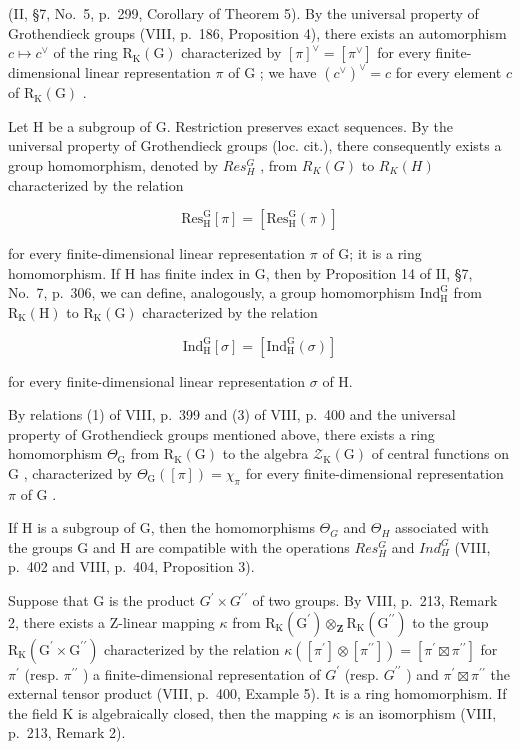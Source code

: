 (II, §7, No.~5, p.~299, Corollary of Theorem 5). By the universal property of Grothendieck groups (VIII, p.~186, Proposition 4), there exists an automorphism \(c \mapsto c^{\vee}\) of the ring \(\mathrm{R}_{\mathrm{K}}(\mathrm{G})\) characterized by \([\pi]^{\vee} = [\pi^{\vee}]\) for every finite-dimensional linear representation \(\pi\) of \(\mathrm{G}\) ; we have \((c^{\vee})^{\vee} = c\) for every element \(c\) of \(\mathrm{R}_{\mathrm{K}}(\mathrm{G})\) .

Let H be a subgroup of G. Restriction preserves exact sequences. By the universal property of Grothendieck groups (loc. cit.), there consequently exists a group homomorphism, denoted by \(Res_{H}^{G}\) , from \(R_{K}(G)\) to \(R_{K}(H)\) characterized by the relation

\[
\mathrm{Res} _ {\mathrm{H}} ^ {\mathrm{G}} [ \pi ] = [ \mathrm{Res} _ {\mathrm{H}} ^ {\mathrm{G}} (\pi) ]\tag{6}
\]

for every finite-dimensional linear representation \(\pi\) of G; it is a ring homomorphism. If H has finite index in G, then by Proposition 14 of II, §7, No.~7, p.~306, we can define, analogously, a group homomorphism \(\mathrm{Ind}_{\mathrm{H}}^{\mathrm{G}}\) from \(\mathrm{R}_{\mathrm{K}}(\mathrm{H})\) to \(\mathrm{R}_{\mathrm{K}}(\mathrm{G})\) characterized by the relation

\[
\mathrm{Ind} _ {\mathrm{H}} ^ {\mathrm{G}} [ \sigma ] = [ \mathrm{Ind} _ {\mathrm{H}} ^ {\mathrm{G}} (\sigma) ]\tag{7}
\]

for every finite-dimensional linear representation \(\sigma\) of H.

By relations (1) of VIII, p.~399 and (3) of VIII, p.~400 and the universal property of Grothendieck groups mentioned above, there exists a ring homomorphism \(\Theta_{\mathrm{G}}\) from \(\mathrm{R}_{\mathrm{K}}(\mathrm{G})\) to the algebra \(\mathcal{Z}_{\mathrm{K}}(\mathrm{G})\) of central functions on \(\mathrm{G}\) , characterized by \(\Theta_{\mathrm{G}}([\pi]) = \chi_{\pi}\) for every finite-dimensional representation \(\pi\) of \(\mathrm{G}\) .

If H is a subgroup of G, then the homomorphisms \(\Theta_{G}\) and \(\Theta_{H}\) associated with the groups G and H are compatible with the operations \(Res_{H}^{G}\) and \(Ind_{H}^{G}\) (VIII, p.~402 and VIII, p.~404, Proposition 3).

Suppose that G is the product \(G^{\prime} \times G^{\prime\prime}\) of two groups. By VIII, p.~213, Remark 2, there exists a Z-linear mapping \(\kappa\) from \(\mathrm{R}_{\mathrm{K}}(\mathrm{G}^{\prime}) \otimes_{\mathbf{Z}} \mathrm{R}_{\mathrm{K}}(\mathrm{G}^{\prime\prime})\) to the group \(\mathrm{R}_{\mathrm{K}}(\mathrm{G}^{\prime} \times \mathrm{G}^{\prime\prime})\) characterized by the relation \(\kappa([\pi^{\prime}] \otimes [\pi^{\prime\prime}]) = [\pi^{\prime} \boxtimes \pi^{\prime\prime}]\) for \(\pi^{\prime}\) (resp. \(\pi^{\prime\prime}\) ) a finite-dimensional representation of \(G^{\prime}\) (resp. \(G^{\prime\prime}\) ) and \(\pi^{\prime} \boxtimes \pi^{\prime\prime}\) the external tensor product (VIII, p.~400, Example 5). It is a ring homomorphism. If the field K is algebraically closed, then the mapping \(\kappa\) is an isomorphism (VIII, p.~213, Remark 2).

